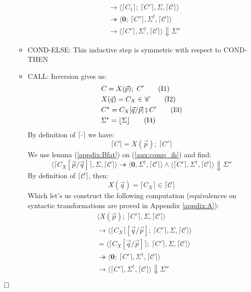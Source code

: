 \documentclass[12pt,a4paper,twoside]{book}
\newcommand{\qed}{\hfill\square}
\begin{document}
\begin{itemize}
\begin{itemize}
\begin{align*}
&\rightarrow \langle \lceil C_1\rceil;~ \lceil C'\rceil, \Sigma, \lceil \mathscr{C}\rceil\rangle\\
&\twoheadrightarrow \langle \boldsymbol{0};~ \lceil C'\rceil, \Sigma^\dag, \lceil \mathscr{C} \rceil \rangle \\
&\rightarrow \langle \lceil C'\rceil, \Sigma^\dag, \lceil \mathscr{C} \rceil \rangle\Downarrow \Sigma''
\end{align*}
\item COND-ELSE: This inductive step is symmetric with respect to COND-THEN
\item CALL: Inversion gives us:
\begin{align}
&C = X(\vec{p});~ C' \label{aux:comp_call1}\tag{I1}\\
&X(\vec{q}) = C_X \in \mathscr{C} \label{aux:comp_call2}\tag{I2}\\
&C^\star = C_X[\vec{q}/\vec{p}] \fatsemi C'\label{aux:comp_then3}\tag{I3}\\
&\Sigma^\star = \lfloor \Sigma \rfloor\label{aux:comp_then4}\tag{I4}
\end{align}
By definition of $\lceil \cdot \rceil$ we have:
$$
\lceil C\rceil = X(\vec{p});~ \lceil C'\rceil
$$
We use lemma (\ref{appdix:Bfat}) on (\ref{aux:comp_ih}) and find:
$$
\langle \lceil C_X[\vec{p}/\vec{q}] \rceil, \Sigma, \lceil \mathscr{C} \rceil \rangle \twoheadrightarrow \langle \boldsymbol{0}, \Sigma^\dag, \lceil \mathscr{C} \rceil \rangle 
\land
\langle \lceil C' \rceil, \Sigma^\dag, \lceil \mathscr{C} \rceil \rangle \Downarrow \Sigma''
$$
By definition of $\lceil \mathscr{C} \rceil$, then:
$$
X(\vec{q}) = \lceil C_X \rceil \in \lceil \mathscr{C} \rceil
$$
Which let's us construct the following computation (equivalences on syntactic transformations are proved in Appendix \ref{appdix:A}):
\begin{align*}
&\langle X(\vec{p});~ \lceil C'\rceil, \Sigma, \lceil \mathscr{C}\rceil\rangle\\
&\rightarrow \langle \lceil C_X\rceil[\vec{q}/\vec{p}];~ \lceil C'\rceil, \Sigma, \lceil \mathscr{C}\rceil\rangle\\
&= \langle \lceil C_X[\vec{q}/\vec{p}]\rceil;~ \lceil C'\rceil, \Sigma, \lceil \mathscr{C}\rceil\rangle\\
&\twoheadrightarrow \langle \boldsymbol{0};~ \lceil C'\rceil, \Sigma^\dag, \lceil \mathscr{C} \rceil \rangle \\
&\rightarrow \langle \lceil C'\rceil, \Sigma^\dag, \lceil \mathscr{C} \rceil \rangle\Downarrow \Sigma''
\end{align*}
\end{itemize}
\end{itemize}
$\qed$
\end{document}
